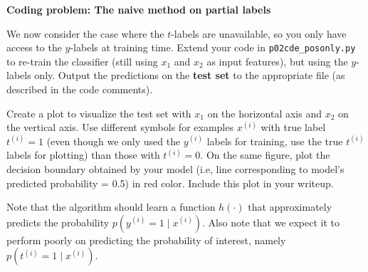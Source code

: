 \item {} \textbf{Coding problem: The naive method on partial labels}

We now consider the case where the $t$-labels are unavailable, so you only have
access to the $y$-labels at training time. Extend your code in
\texttt{p02cde\_posonly.py} to re-train the classifier (still using $x_1$ and
$x_2$ as input features), but using the $y$-labels only. Output the predictions
on the \textbf{test set} to the appropriate file (as described in the code comments).


Create a plot to visualize the test set with $x_1$ on the horizontal axis and $x_2$ on
the vertical axis. Use different symbols for examples $x^{(i)}$ with true label $t^{(i)} = 1$ (even though we only
used the $y^{(i)}$ labels for training, use the true $t^{(i)}$ labels for plotting)
than those with $t^{(i)} = 0$. On the same figure, plot the decision boundary obtained
by your model (i.e, line corresponding to model's predicted probability = 0.5) in red color. Include
this plot in your writeup.


Note that the algorithm should learn a function $h(\cdot)$ that approximately predicts the probability $p(y^{(i)}=1\mid x^{(i)})$. Also note that we expect it to perform poorly on predicting the probability of interest, namely $p(t^{(i)}=1\mid x^{(i)})$.

